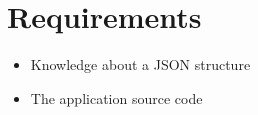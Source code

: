 \section{Requirements}

\begin{itemize}
    \item Knowledge about a JSON structure
    \item The application source code
\end{itemize}